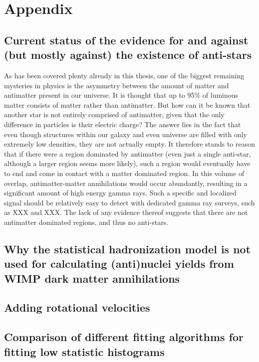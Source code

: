 \section{Appendix}
\subsection{Current status of the evidence for and against (but mostly against) the existence of anti-stars}
As has been covered plenty already in this thesis, one of the biggest remaining mysteries in physics is the asymmetry between the amount of matter and antimatter present in our universe. It is thought that up to 95\% of luminous matter consists of matter rather than antimatter\cite{}. But how can it be known that another star is not entirely comprised of antimatter, given that the only difference in particles is their electric charge? The answer lies in the fact that even though structures within our galaxy and even universe are filled with only extremely low densities, they are not actually empty. It therefore stands to reason that if there were a region dominated by antimatter (even just a single anti-star, although a larger region seems more likely), such a region would eventually have to end and come in contact with a matter dominated region. In this volume of overlap, antimatter-matter annihilations would occur abundantly, resulting in a significant amount of high energy gamma rays. Such a specific and localized signal should be relatively easy to detect with dedicated gamma ray surveys, such as XXX\cite{} and XXX\cite{}. The lack of any evidence thereof suggests that there are not antimatter dominated regions, and thus no anti-stars. 
\subsection{Why the statistical hadronization model is not used for calculating (anti)nuclei yields from WIMP dark matter annihilations}\label{App:statHadronModel}
\subsection{Adding rotational velocities}
\subsection{Comparison of different fitting algorithms for fitting low statistic histograms}\label{sec:App:lowStatFitting}